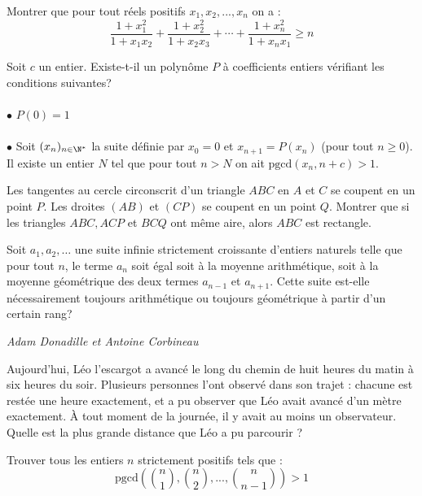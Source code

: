 \begin{exo}{}
Montrer que pour tout réels positifs $x_1,x_2,...,x_n$ on a :
$$\frac{1+x_{1}^2}{1+x_{1}x_{2}}+\frac{1+x_{2}^2}{1+x_{2}x_{3}}+\cdots+\frac{1+x_{n}^2}{1+x_{n}x_{1}}\geq n$$
\end{exo}

\begin{exo}{}
Soit $c$ un entier. Existe-t-il un polynôme $P$ à coefficients entiers vérifiant les conditions suivantes?\\~~\\
$\bullet$ $P(0)=1$\\~~\\
$\bullet$ Soit $(x_n)_{n\in \N^*}$ la suite définie par $x_0=0$ et $x_{n+1}=P(x_n)$ (pour tout $n\ge 0$). Il existe un entier $N$ tel que pour tout $n>N$ on ait $\text{pgcd}(x_n,n+c)>1$.
\end{exo}

\begin{exo}{}
Les tangentes au cercle circonscrit d'un triangle $ABC$ en $A$ et $C$ se coupent en un point $P$. Les droites $(AB)$ et $(CP)$ se coupent en un point $Q$. Montrer que si les triangles $ABC,ACP$ et $BCQ$ ont même aire, alors $ABC$ est rectangle.
\end{exo}

\begin{exo}{}Soit $a_1,a_2,\ldots$ une suite infinie strictement croissante d'entiers naturels telle que pour tout $n$, le terme $a_n$ soit égal soit à la moyenne arithmétique, soit à la moyenne géométrique des deux termes $a_{n-1}$ et $a_{n+1}$. Cette suite est-elle nécessairement toujours arithmétique ou toujours géométrique à partir d'un certain rang?

\medskip
\textit{Adam Donadille et Antoine Corbineau}
\end{exo}

\begin{exo}{}
Aujourd'hui, Léo l'escargot a avancé le long du chemin de huit heures du matin à six heures du soir. Plusieurs personnes l'ont observé dans son trajet : chacune est restée une heure exactement, et a pu observer que Léo avait avancé d'un mètre exactement. \`{A} tout moment de la journée, il y avait au moins un observateur. Quelle est la plus grande distance que Léo a pu parcourir ?
\end{exo}


\begin{exo}{}
Trouver tous les entiers $n$ strictement positifs tels que :
$$\text{pgcd}\left(\binom{n}{1},\binom{n}{2},...,\binom{n}{n-1}\right)>1$$

\end{exo}

